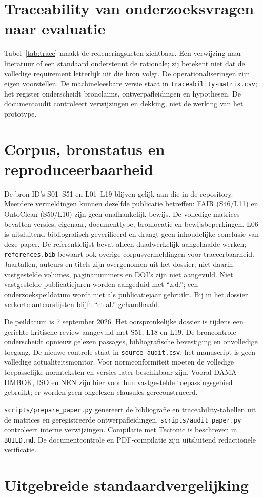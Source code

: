 \documentclass[11pt,a4paper]{article}
\begin{document}
\section{Traceability van onderzoeksvragen naar evaluatie}
\label{sec:trace}
Tabel~\ref{tab:trace} maakt de redeneringsketen zichtbaar. Een verwijzing naar literatuur of een standaard ondersteunt de rationale; zij betekent niet dat de volledige requirement letterlijk uit die bron volgt. De operationaliseringen zijn eigen voorstellen. De machineleesbare versie staat in \texttt{traceability-matrix.csv}; het register onderscheidt bronclaims, ontwerpafleidingen en hypothesen. De documentaudit controleert verwijzingen en dekking, niet de werking van het prototype.
\begingroup\small


\endgroup
\section{Corpus, bronstatus en reproduceerbaarheid}
\label{sec:corpus}
De bron-ID’s S01--S51 en L01--L19 blijven gelijk aan die in de repository. Meerdere vermeldingen kunnen dezelfde publicatie betreffen: FAIR (S46/L11) en OntoClean (S50/L10) zijn geen onafhankelijk bewijs. De volledige matrices bevatten versies, eigenaar, documenttype, bronlocatie en bewijsbeperkingen. L06 is uitsluitend bibliografisch geverifieerd en draagt geen inhoudelijke conclusie van deze paper. De referentielijst bevat alleen daadwerkelijk aangehaalde werken; \texttt{references.bib} bewaart ook overige corpusvermeldingen voor traceerbaarheid. Jaartallen, auteurs en titels zijn overgenomen uit het dossier; niet daarin vastgestelde volumes, paginanummers en DOI’s zijn niet aangevuld. Niet vastgestelde publicatiejaren worden aangeduid met ``z.d.''; een onderzoekspeildatum wordt niet als publicatiejaar gebruikt. Bij in het dossier verkorte auteurslijsten blijft ``et al.'' gehandhaafd.

De peildatum is 7 september 2026. Het oorspronkelijke dossier is tijdens een gerichte kritische review aangevuld met S51, L18 en L19. De broncontrole onderscheidt opnieuw gelezen passages, bibliografische bevestiging en onvolledige toegang. De nieuwe controle staat in \texttt{source-audit.csv}; het manuscript is geen volledige actualiteitsmonitor. Voor normconformiteit moeten de volledige toepasselijke normteksten en versies later beschikbaar zijn. Vooral DAMA-DMBOK, ISO en NEN zijn hier voor hun vastgestelde toepassingsgebied gebruikt; er worden geen ongelezen clausules gereconstrueerd.

\texttt{scripts/prepare\_paper.py} genereert de bibliografie en traceability-tabellen uit de matrices en geregistreerde ontwerpafleidingen. \texttt{scripts/audit\_paper.py} controleert interne verwijzingen. Compilatie met Tectonic is beschreven in \texttt{BUILD.md}. De documentcontrole en PDF-compilatie zijn uitsluitend redactionele verificatie.
\section{Uitgebreide standaardvergelijking}
\label{sec:full-standards}



\end{document}
